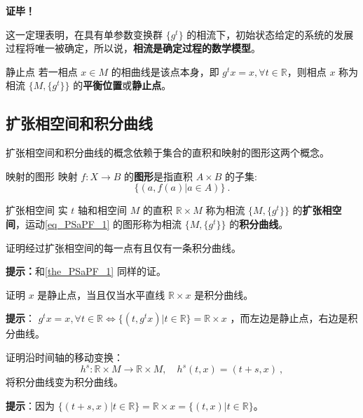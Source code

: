 \textbf{证毕！}

这一定理表明，在具有单参数变换群 $\{g^t\}$ 的相流下，初始状态给定的系统的发展过程将唯一被确定，所以说，\textbf{相流是确定过程的数学模型}。
\begin{definition}{静止点}
若一相点 $x\in M$ 的相曲线是该点本身，即 $g^t x=x,\forall t\in\mathbb R$，则相点 $x$ 称为相流 $\{M,\{g^t\}\}$ 的\textbf{平衡位置}或\textbf{静止点}。
\end{definition}
\subsection{扩张相空间和积分曲线}
扩张相空间和积分曲线的概念依赖于集合的直积和映射的图形这两个概念。
\begin{definition}{映射的图形}
映射 $f:X\rightarrow B$ 的\textbf{图形}是指直积 $A\times B$ 的子集:
\begin{equation}
\{(a,f(a)|a\in A)\}~.
\end{equation}
\end{definition}
\begin{definition}{扩张相空间}
实 $t$ 轴和相空间 $M$ 的直积 $\mathbb R\times M$ 称为相流 $\{M,\{g^t\}\}$ 的\textbf{扩张相空间}，运动\autoref{eq_PSaPF_1} 的图形称为相流 $\{M,\{g^t\}\}$ 的\textbf{积分曲线}。
\end{definition}
\begin{exercise}{}
证明经过扩张相空间的每一点有且仅有一条积分曲线。
\end{exercise}
\textbf{提示：}和\autoref{the_PSaPF_1} 同样的证。

\begin{exercise}{}
证明 $x$ 是静止点，当且仅当水平直线 $\mathbb R\times x$ 是积分曲线。
\end{exercise}
\textbf{提示}： $g^t x=x,\forall t\in\mathbb R\Leftrightarrow\{(t,g^t x)|t\in \mathbb R\}=\mathbb R\times x$ ，而左边是静止点，右边是积分曲线。
\begin{exercise}{}
证明沿时间轴的移动变换：
\begin{equation}
h^s:\mathbb R\times M\rightarrow\mathbb R\times M,\quad h^s(t,x)=(t+s,x)~,
\end{equation}
将积分曲线变为积分曲线。
\end{exercise}
\textbf{提示}：因为 $\{(t+s,x)|t\in\mathbb R\}=\mathbb R\times x=\{(t,x)|t\in\mathbb R\}$。